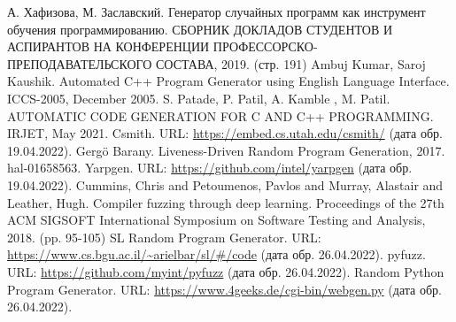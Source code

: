 \documentclass[a4paper,article,14pt]{extarticle}
\begin{document}


\tableofcontents
\pagebreak
















\begin{thebibliography}{1}
     А. Хафизова, М. Заславский. Генератор случайных программ как инструмент обучения программированию. СБОРНИК ДОКЛАДОВ СТУДЕНТОВ И АСПИРАНТОВ НА КОНФЕРЕНЦИИ ПРОФЕССОРСКО-ПРЕПОДАВАТЕЛЬСКОГО СОСТАВА, 2019. (стр. 191)
     Ambuj Kumar, Saroj Kaushik. Automated C++ Program Generator using English Language Interface. ICCS-2005, December 2005.
     S. Patade, P. Patil, A. Kamble , M. Patil. AUTOMATIC CODE GENERATION FOR C AND C++ PROGRAMMING. IRJET, May 2021.
     Csmith. URL: \url{https://embed.cs.utah.edu/csmith/} (дата обр. 19.04.2022).
     Gergö Barany. Liveness-Driven Random Program Generation, 2017. hal-01658563.
     Yarpgen. URL: \url{https://github.com/intel/yarpgen} (дата обр. 19.04.2022).
     Cummins, Chris and Petoumenos, Pavlos and Murray, Alastair and Leather, Hugh.
    Compiler fuzzing through deep learning.
    Proceedings of the 27th ACM SIGSOFT International Symposium on Software Testing and Analysis, 2018. (pp. 95-105)
     SL Random Program Generator. URL:
    \url{https://www.cs.bgu.ac.il/~arielbar/sl/#/code} (дата обр. 26.04.2022).
     pyfuzz. URL: \url{https://github.com/myint/pyfuzz} (дата обр. 26.04.2022). 
     Random Python Program Generator. URL: \url{https://www.4geeks.de/cgi-bin/webgen.py} 
    (дата обр. 26.04.2022).
\end{thebibliography}
\end{document}

